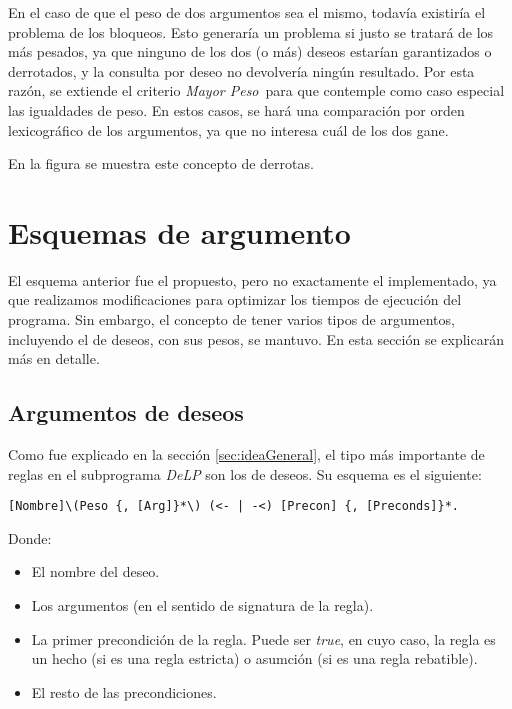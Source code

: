 \documentclass[oneside]{book}
\begin{document}
En el caso de que el peso de dos argumentos sea el mismo, todavía existiría el problema 
de los bloqueos. Esto generaría un problema si justo se tratará de los más pesados, ya 
que ninguno de los dos (o más) deseos estarían garantizados o derrotados, y la consulta
por deseo no devolvería ningún resultado. Por esta razón, se extiende el criterio 
\textit{Mayor Peso}\ para que contemple como caso especial las igualdades de peso. En 
estos casos, se hará una comparación por orden lexicográfico de los argumentos, ya que
no interesa cuál de los dos gane. 

En la figura %
se muestra este concepto de derrotas. %


\section{Esquemas de argumento}

\label{sec:esquemasArgumento}


El esquema anterior fue el propuesto, pero no exactamente el implementado, ya que
realizamos modificaciones para optimizar los tiempos de ejecución del programa. Sin 
embargo, el concepto de tener varios tipos de argumentos, incluyendo el de deseos, con sus
pesos, se mantuvo. En esta sección se explicarán más en detalle.

\subsection{Argumentos de deseos}

\label{sec:argumentosDeDeseos}

Como fue explicado en la sección \ref{sec:ideaGeneral}, el tipo más importante de 
reglas en el subprograma \textit{DeLP} son los de deseos. Su esquema es el siguiente:

\begin{verbatim}
[Nombre]\(Peso {, [Arg]}*\) (<- | -<) [Precon] {, [Preconds]}*.
\end{verbatim}

Donde:

\begin{itemize}
    \item [Nombre] El nombre del deseo.
    \item [Arg] Los argumentos (en el sentido de signatura de la regla).
    \item [Precon] La primer precondición de la regla. Puede ser \textit{true}, en cuyo
    caso, la regla es un hecho (si es una regla estricta) o asumción (si es una regla 
    rebatible).
    \item [Precons] El resto de las precondiciones.

\end{itemize}
\end{document}
